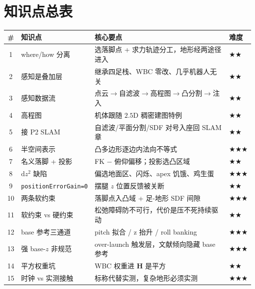 \section*{知识点总表}
\begin{table}[H]\centering\small
\begin{tabular}{clll}
\toprule
\# & 知识点 & 核心要点 & 难度 \\
\midrule
1 & where/how 分离 & 选落脚点 + 求力轨迹分工，地形经两途径进入 & \(\bigstar\bigstar\) \\
2 & 感知是叠加层 & 继承四足栈、WBC 零改、几乎机器人无关 & \(\bigstar\bigstar\) \\
3 & 感知数据流 & 点云$\to$自滤波$\to$高程图$\to$凸分割$\to$注入 & \(\bigstar\bigstar\) \\
4 & 高程图 & 机体跟随 $2.5$D 稠密建图特例 & \(\bigstar\bigstar\) \\
5 & 接 P2 SLAM & 自滤波/平面分割/SDF 对号入座回 SLAM 章 & \(\bigstar\bigstar\) \\
6 & 半空间表示 & 凸多边形逐边内法向不等式 & \(\bigstar\bigstar\bigstar\) \\
7 & 名义落脚 + 投影 & FK $-$ 俯仰偏移；投影选凸区域 & \(\bigstar\bigstar\) \\
8 & $\mathrm{d}z^2$ 缺陷 & 偏选地面区、闪烁、apex 饥饿、鸡生蛋 & \(\bigstar\bigstar\bigstar\) \\
9 & \texttt{positionErrorGain=0} & 摆腿 $z$ 位置反馈被关断 & \(\bigstar\bigstar\) \\
10 & 两条软约束 & 落脚点入凸域 + 足-地形 SDF 间隙 & \(\bigstar\bigstar\bigstar\) \\
11 & 软约束 vs 硬约束 & 松弛障碍防不可行，代价是压不死持续驱动 & \(\bigstar\bigstar\) \\
12 & base 参考三通道 & pitch 拟合 / z 抬升 / roll banking & \(\bigstar\bigstar\bigstar\) \\
13 & 强 base-$z$ 非规范 & over-launch 触发层，文献倾向隐藏 base 参考 & \(\bigstar\bigstar\bigstar\) \\
14 & 平方权重坑 & WBC 权重进 $\mathbf{H}$ 是平方 & \(\bigstar\bigstar\) \\
15 & 时钟 vs 实测接触 & 标称代替实测，复杂地形必须实测 & \(\bigstar\bigstar\bigstar\) \\
\bottomrule
\end{tabular}
\end{table}

